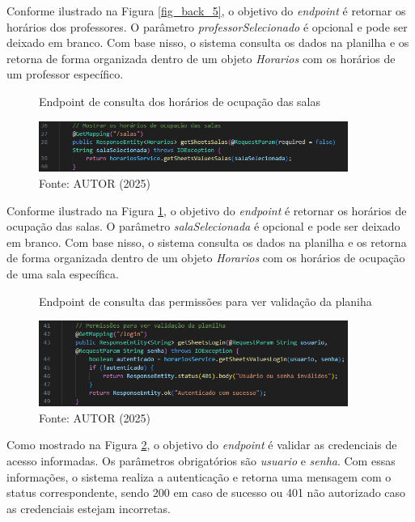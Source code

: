 \begin{itemize}
    Conforme ilustrado na Figura \ref{fig_back_5}, o objetivo do \textit{endpoint} é retornar os horários dos professores. O parâmetro \textit{professorSelecionado} é opcional e pode ser deixado em branco. Com base nisso, o sistema consulta os dados na planilha e os retorna de forma organizada dentro de um objeto \textit{Horarios} com os horários de um professor específico.

    \begin{figure}[htb]
        \centering
        \caption{Endpoint de consulta dos horários de ocupação das salas}
        \includegraphics[width=0.9\textwidth]{Figuras/back-6.png}
        \caption*{Fonte: AUTOR (2025)}
        \label{fig_back_6}
    \end{figure}

    Conforme ilustrado na Figura \ref{fig_back_6}, o objetivo do \textit{endpoint} é retornar os horários de ocupação das salas. O parâmetro \textit{salaSelecionada} é opcional e pode ser deixado em branco. Com base nisso, o sistema consulta os dados na planilha e os retorna de forma organizada dentro de um objeto \textit{Horarios} com os horários de ocupação de uma sala específica.

    \begin{figure}[H]
        \centering
        \caption{Endpoint de consulta das permissões para ver validação da planiha}
        \includegraphics[width=0.9\textwidth]{Figuras/back-7.png}
        \caption*{Fonte: AUTOR (2025)}
        \label{fig_back_7}
    \end{figure}

    Como mostrado na Figura \ref{fig_back_7}, o objetivo do \textit{endpoint} é validar as credenciais de acesso informadas. Os parâmetros obrigatórios são \textit{usuario} e \textit{senha}. Com essas informações, o sistema realiza a autenticação e retorna uma mensagem com o status correspondente, sendo 200 em caso de sucesso ou 401 não autorizado caso as credenciais estejam incorretas.


\end{itemize}
